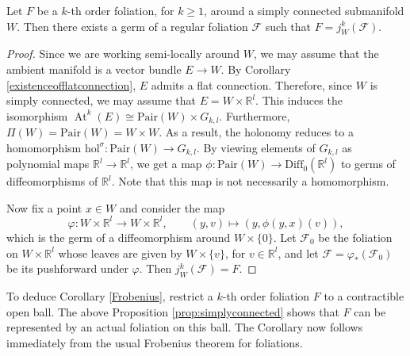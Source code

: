 \documentclass[10pt]{amsart}
\newcommand{\ff}{\mathcal{F}}
\DeclareMathOperator{\At}{At}
\numberwithin{theoremalpha}{section}
\numberwithin{equation}{section}
\numberwithin{definition}{section}
\numberwithin{theorem}{section}
\numberwithin{proposition}{section}
\numberwithin{lemma}{section}
\numberwithin{example}{section}
\numberwithin{remark}{section}
\numberwithin{corollary}{section}
\numberwithin{question}{section}
\numberwithin{problem}{section}
\numberwithin{assumption}{section}
\theoremstyle{named}
\numberwithin{equation}{section}
\begin{document}
\begin{proposition}\label{prop:simplyconnected}
Let $F$ be a $k$-th order foliation, for $k \geq 1$, around a simply connected submanifold $W$. Then there exists a germ of a regular foliation $\ff$ such that $F = j_{W}^{k}(\ff)$. 
\end{proposition}
\begin{proof}
Since we are working semi-locally around $W$, we may assume that the ambient manifold is a vector bundle $E \to W$. By Corollary \ref{existenceofflatconnection}, $E$ admits a flat connection. Therefore, since $W$ is simply connected, we may assume that $E = W \times \mathbb{R}^l$. This induces the isomorphism $\At^{k}(E) \cong \mathrm{Pair}(W) \times G_{k,l}$. Furthermore, $\Pi(W) = \mathrm{Pair}(W) = W \times W$. As a result, the holonomy reduces to a homomorphism $\mathrm{hol}^{\sigma} : \mathrm{Pair}(W) \to G_{k,l}$. By viewing elements of $G_{k,l}$ as polynomial maps $\mathbb{R}^l \to \mathbb{R}^l$, we get a map $\phi: \mathrm{Pair}(W) \to \mathrm{Diff}_{0}(\mathbb{R}^l)$ to germs of diffeomorphisms of $\mathbb{R}^l$. Note that this map is not necessarily a homomorphism. 

Now fix a point $x \in W$ and consider the map 
\[
\varphi : W \times \mathbb{R}^l \to W \times \mathbb{R}^l, \qquad (y,v) \mapsto (y, \phi(y,x)(v)),
\]
which is the germ of a diffeomorphism around $W \times \{ 0 \}$. Let $\ff_0$ be the foliation on $W \times \mathbb{R}^l$ whose leaves are given by $W \times \{v \}$, for $v \in \mathbb{R}^l$, and let $\ff = \varphi_{*}(\ff_{0})$ be its pushforward under $\varphi$. Then $j_{W}^k(\ff) = F$.
\end{proof}


To deduce Corollary \ref{Frobenius}, restrict a $k$-th order foliation $F$ to a contractible open ball. The above Proposition \ref{prop:simplyconnected} shows that $F$ can be represented by an actual foliation on this ball. The Corollary now follows immediately from the usual Frobenius theorem for foliations. 
\end{document}
